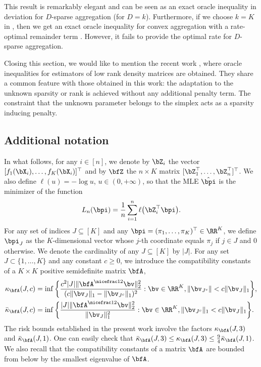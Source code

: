This result is remarkably elegant and can be seen as an exact oracle inequality in deviation for $D$-sparse aggregation (for $D=k$).
Furthermore, if we choose $k=K$ in , then we get an exact oracle inequality for convex aggregation with a
rate-optimal remainder term  \citep{Tsybakov03}. However, it fails to provide the optimal rate for $D$-sparse aggregation.

Closing this section, we would like to mention the recent work \citep{Xia16}, where oracle inequalities for estimators of low rank
density matrices are obtained. They share a common feature with those obtained in this work: the adaptation to the unknown sparsity
or rank is achieved without any additional penalty term. The constraint that the unknown parameter belongs to the simplex acts
as a sparsity inducing penalty.

\subsection{Additional notation}

In what follows, for any $i\in [n]$, we denote by $\bZ_i$ the vector $[f_1(\bX_i),\ldots,f_K(\bX_i)]^\top$ and
by $\bfZ$ the $n\times K$ matrix  $[\bZ^\top_1,\ldots,\bZ^\top_n]^\top$. We also define $\ell(u) = -\log u$,
$u\in(0,+\infty)$,
so that the MLE $\hat\bpi$ is the minimizer of the function
\begin{equation}
\label{Phi}
L_n(\bpi) = \frac1n\sum_{i=1}^n \ell\big(\bZ_i^\top\bpi\big).
\end{equation}
For any set of indices $J\subseteq [K]$ and any $\bpi=(\pi_1,\dots,\pi_K)^{\top}\in\RR^K$,
we define $\bpi_J$ as the $K$-dimensional vector whose $j$-th coordinate equals $\pi_j$ if $j\in J$ and $0$ otherwise.
We denote the cardinality of any $J\subseteq[K]$ by $\vert J\vert$. For any set $J\subset \{1, \dots, K\}$ and any
constant $c\geq 0$, we introduce the compatibility constants \citep{VandeGeerConditionLasso09}
of a $K\times K$ positive semidefinite matrix $\bfA$,
\begin{align}
  \kappa_{\bfA}(J,c) &= \inf\bigg\{ \frac{c^2|J|\|\bfA^{\nicefrac12}\bv \|_2^2}{(c\|\bv_J\|_1-\|\bv_{J^c}\|_1)^2} :
        \bv\in\RR^K,\|\bv_{J^c}\|< c\|\bv_J\|_1\bigg\},\\
 \bar\kappa_\bfA(J,c) &=\inf\bigg\{\frac{|J|\|\bfA^{\nicefrac12}\bv\|_2^{2}}{\Vert \bv_{J}\Vert^{2}_{1}}:
        \bv\in\RR^{K},\Vert \bv_{J^{c}}\Vert_{1}<c\Vert \bv_{J}\Vert_{1}\bigg\}.
\end{align}
The risk bounds established in the present work involve the factors $\kappa_{\bfA}(J,3)$ and
$\bar\kappa_{\bfA}(J,1)$. One can easily check that $\bar\kappa_{\bfA}(J,3)\le \kappa_{\bfA}(J,3)
\le \frac94 \bar\kappa_{\bfA}(J,1)$. We also recall that the compatibility constants of a matrix
$\bfA$ are bounded  from below by the smallest eigenvalue of $\bfA$.

